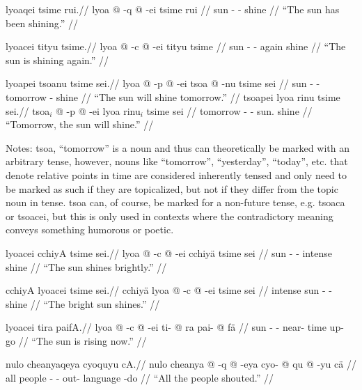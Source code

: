\documentclass{article}
\begin{document}
\ex[lingstyle=QuCheanya] \begingl
\glpreamble lyoaqei tsime rui.//
\gla lyoa @ -q @ -ei tsime rui //
\glb sun - - shine  //
\glft ``The sun has been shining.'' //
\endgl \xe

\ex[lingstyle=QuCheanya] \begingl
\glpreamble lyoacei tityu tsime.//
\gla lyoa @ -c @ -ei tityu tsime //
\glb sun - - again shine //
\glft ``The sun is shining again.'' //
\endgl \xe

\pex[lingstyle=QuCheanya] 
\a \begingl
\glpreamble lyoapei tsoanu tsime sei.//
\gla lyoa @ -p @ -ei tsoa @ -nu tsime sei //
\glb sun - - tomorrow - shine  //
\glft ``The sun will shine tomorrow.'' //
\endgl 
\a \begingl
\glpreamble tsoapei lyoa rinu tsime sei.//
\gla tsoa$_i$ @ -p @ -ei lyoa rinu$_i$ tsime sei //
\glb tomorrow - - sun.  shine  //
\glft ``Tomorrow, the sun will shine.'' //
\endgl
\xe

Notes: {\quch tsoa}, ``tomorrow'' is a noun and thus can theoretically be marked with an arbitrary tense, however, nouns like ``tomorrow'', ``yesterday'', ``today'', etc. that denote relative points in time are considered inherently tensed and only need to be marked as such if they are topicalized, but not if they differ from the topic noun in tense.  {\quch tsoa} can, of course, be marked for a non-future tense, e.g. {\quch tsoaca} or {\quch tsoacei}, but this is only used in contexts where the contradictory meaning conveys something humorous or poetic.

\ex[lingstyle=QuCheanya] \begingl
\glpreamble lyoacei cchiyA tsime sei.//
\gla lyoa @ -c @ -ei cchiy\"a tsime sei //
\glb sun - - intense shine  //
\glft ``The sun shines brightly.'' //
\endgl \xe

\ex[lingstyle=QuCheanya] \begingl
\glpreamble cchiyA lyoacei tsime sei.//
\gla cchiy\"a lyoa @ -c @ -ei tsime sei //
\glb intense sun - - shine  //
\glft ``The bright sun shines.'' //
\endgl \xe

\ex[lingstyle=QuCheanya] \begingl
\glpreamble lyoacei tira paifA.//
\gla lyoa @ -c @ -ei ti- @ ra pai- @ f\"a //
\glb sun - - near- time up- go //
\glft ``The sun is rising now.'' //
\endgl \xe

\ex[lingstyle=QuCheanya] \begingl
\glpreamble nulo cheanyaqeya cyoquyu cA.//
\gla nulo cheanya @ -q @ -eya cyo- @ qu @ -yu c\"a //
\glb all people - - out- language -do  //
\glft ``All the people shouted.'' //
\endgl \xe
\end{document}
